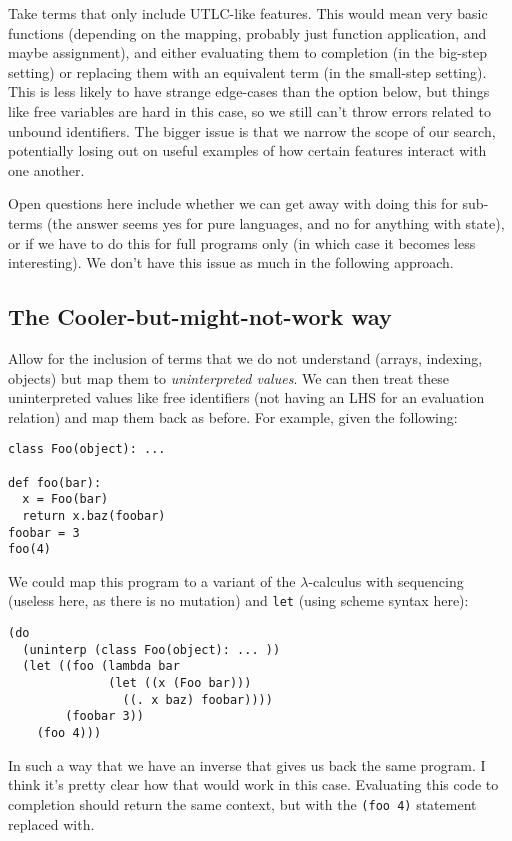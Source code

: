\documentclass[12pt]{article}
\begin{document}
Take terms that only include UTLC-like features. This would mean very basic
functions (depending on the mapping, probably just function application, and
maybe assignment), and either evaluating them to completion (in the big-step
setting) or replacing them with an equivalent term (in the small-step setting).
This is less likely to have strange edge-cases than the option below, but
things like free variables are hard in this case, so we still can't throw errors
related to unbound identifiers. The bigger issue is that we narrow the scope of
our search, potentially losing out on useful examples of how certain features
interact with one another.

Open questions here include whether we can get away with doing this for
sub-terms (the answer seems yes for pure languages, and no for anything with
state), or if we have to do this for full programs only (in which case it
becomes less interesting). We don't have this issue as much in the following
approach.

\subsection{The Cooler-but-might-not-work way}

Allow for the inclusion of terms that we do not understand (arrays, indexing,
objects) but map them to \emph{uninterpreted values}. We can then treat these
uninterpreted values like free identifiers (not having an LHS for an evaluation
relation) and map them back as before. For example, given the following:

\begin{verbatim}
class Foo(object): ...

def foo(bar):
  x = Foo(bar)
  return x.baz(foobar)
foobar = 3
foo(4)
\end{verbatim}

We could map this program to a variant of the $\lambda$-calculus with
sequencing (useless here, as there is no mutation) and \texttt{let} (using scheme
syntax here):

\begin{verbatim}
(do
  (uninterp (class Foo(object): ... ))
  (let ((foo (lambda bar
              (let ((x (Foo bar)))
                ((. x baz) foobar))))
        (foobar 3))
    (foo 4)))
\end{verbatim}

In such a way that we have an inverse that gives us back the same program. I
think it's pretty clear how that would work in this case. Evaluating this
code to completion should return the same context, but with the \texttt{(foo
4)} statement replaced with.
\end{document}
